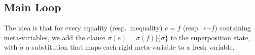 
\subsection{Main Loop}

The idea is that for every equality (resp.~inequality) $e = f$ (resp.~$e \neg f$) containing meta-variables,
we add the clause $\sigma(e) = \sigma(f) | \{ \sigma \}$ to the superposition state, with
$\sigma$ a substitution that maps each rigid meta-variable to a fresh variable.


